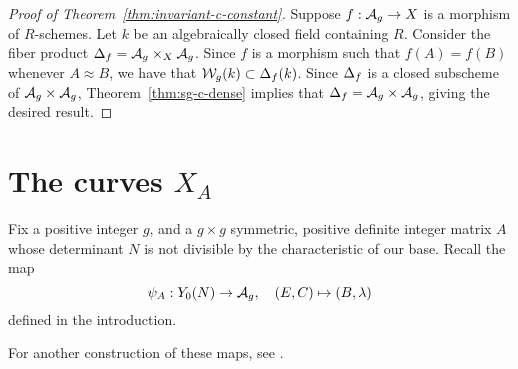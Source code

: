 \documentclass{amsart}
\begin{document}
\begin{proof}[Proof of Theorem~\ref{thm:invariant-c-constant}]
  Suppose $f: \mathcal{A}_g \to X$ is a morphism of $R$-schemes. Let $k$ be an algebraically closed field containing $R$. Consider the fiber product $\Delta_f = \mathcal{A}_g \times_X \mathcal{A}_g$.
Since $f$ is a morphism such that $f(A) = f(B)$ whenever $A \approx B$, we have that $\mathcal{W}_g(k) \subset \Delta_f(k)$.
   Since $\Delta_f$ is a closed subscheme of $\mathcal{A}_g \times \mathcal{A}_g$, Theorem~\ref{thm:sg-c-dense} implies that $\Delta_f = \mathcal{A}_g \times \mathcal{A}_g$, giving the desired result.
\end{proof}



\section{The curves $X_{A}$}
\label{sec:curves-on-Ag}

Fix a positive integer $g$, and a $g \times g$ symmetric, positive definite integer matrix $A$ whose determinant $N$ is not divisible by the characteristic of our base. %
Recall the map
\[
\psi_{A}: Y_0(N) \to \mathcal{A}_g, \quad (E,C) \mapsto (B,\lambda)
\]
defined in the introduction.




For another construction of these maps, see \cite[p. 19 et seq.]{rains}.
\end{document}

